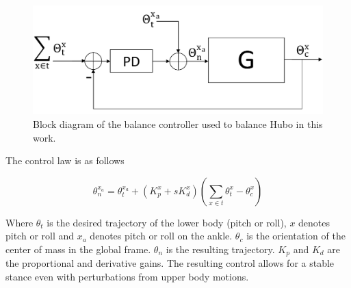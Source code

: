 \begin{figure}[ht]
  \centering
\includegraphics[width=0.8\columnwidth]{./pix/blockDiagram3.pdf}
  \caption{Block diagram of the balance controller used to balance Hubo in this work.}
  \label{fig:ctrlBlockDiagram}
\end{figure}

The control law is as follows

\begin{equation}
\theta_n^{x_a} = \theta_t^{x_a} + \left(K_p^x+sK_d^x\right)\left(\sum\limits_{x \in t} \theta_{t}^x - \theta_{c}^x\right)
\end{equation}

Where $\theta_t$ is the desired trajectory of the lower body (pitch or roll), $x$ denotes pitch or roll and $x_a$ denotes pitch or roll on the ankle.  $\theta_{c}$ is the orientation of the center of mass in the global frame.  $\theta_n$ is the resulting trajectory.  $K_p$ and $K_d$ are the proportional and derivative gains.  The resulting control allows for a stable stance even with perturbations from upper body motions.
